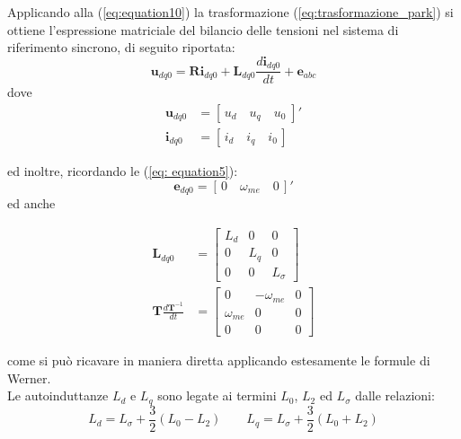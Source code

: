 Applicando alla (\ref{eq:equation10}) la trasformazione (\ref{eq:trasformazione_park}) si ottiene l’espressione matriciale
del bilancio delle tensioni nel sistema di riferimento sincrono, di seguito
riportata:
\begin{equation}
\mathbf{u}_{dq0}=\bm{Ri}_{dq0}+\bm{L}_{dq0}\frac{d\bm{i}_{dq0}}{dt}+\bm{e}_{abc}
\label{eq:electric_equa}
\end{equation}
dove
\begin{equation}
\begin{aligned}
\bm{u}_{dq0} &= [\, u_d \quad u_q \quad u_0 \;]' \\
\bm{i}_{dq0} &= [\, i_d \quad i_q \quad i_0 \,]
\end{aligned}
\label{eq:double_equa}
\end{equation}




ed inoltre, ricordando le (\ref{eq: equation5}):
\begin{equation}
    \bm{e}_{dq0}=[\,0\quad \omega_{me}\quad 0\,]'
\end{equation}
ed anche

\begin{align}
\bm{L}_{dq0} &=
\begin{bmatrix}
    L_d & 0 & 0 \\[6pt]
    0 & L_q & 0 \\[6pt]
    0 & 0 & L_\sigma
\end{bmatrix} \label{eq:trasformazione_park4} \\[12pt]
\bm{T} \frac{d\bm{T}^{-1}}{dt} &=
\begin{bmatrix}
    0 & -\omega_{me} & 0 \\[6pt]
    \omega_{me} & 0 & 0 \\[6pt]
    0 & 0 & 0
\end{bmatrix} \label{eq:trasformazione_park5}
\end{align}

come si può ricavare in maniera diretta applicando estesamente le formule di
Werner.\\
Le autoinduttanze $L_d$ e $L_q$ sono
legate ai termini $L_0$, $L_2$ ed $L_\sigma$ dalle relazioni:
\begin{equation}
L_d = L_\sigma + \frac{3}{2}(L_0 - L_2) \qquad L_q = L_\sigma + \frac{3}{2}(L_0 + L_2)    
\label{eq:double_L}
\end{equation}

